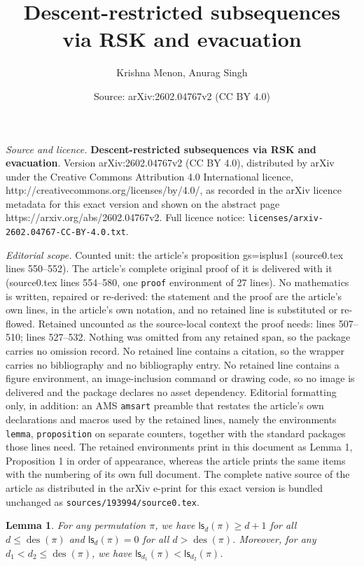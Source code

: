 \documentclass[10pt,a4paper]{amsart}
\title{\large\textbf{Descent-restricted subsequences via RSK and evacuation}}
\author{Krishna Menon, Anurag Singh}
\date{Source: arXiv:2602.04767v2 (CC BY 4.0)}
\newtheorem{lemma}{Lemma}
\newcommand{\des}{\operatorname{des}}
\newcommand{\ls}{\mathsf{ls}}
\begin{document}
\maketitle

\noindent\emph{Source and licence.} \large\textbf{Descent-restricted subsequences via RSK and evacuation}. Version arXiv:2602.04767v2 (CC BY 4.0), distributed by arXiv under the Creative Commons Attribution 4.0 International licence, http://creativecommons.org/licenses/by/4.0/, as recorded in the arXiv licence metadata for this exact version and shown on the abstract page https://arxiv.org/abs/2602.04767v2. Full licence notice: \texttt{licenses/arxiv-2602.04767-CC-BY-4.0.txt}.\par\smallskip

\noindent\textit{Editorial scope.} Counted unit: the article's proposition gs=isplus1 (source0.tex lines 550--552). The article's complete original proof of it is delivered with it (source0.tex lines 554--580, one \texttt{proof} environment of 27 lines). No mathematics is written, repaired or re-derived: the statement and the proof are the article's own lines, in the article's own notation, and no retained line is substituted or re-flowed.  Retained uncounted as the source-local context the proof needs: lines 507--510; lines 527--532.  Nothing was omitted from any retained span, so the package carries no omission record.  No retained line contains a citation, so the wrapper carries no bibliography and no bibliography entry.  No retained line contains a figure environment, an image-inclusion command or drawing code, so no image is delivered and the package declares no asset dependency.  Editorial formatting only, in addition: an AMS \texttt{amsart} preamble that restates the article's own declarations and macros used by the retained lines, namely the environments \texttt{lemma}, \texttt{proposition} on separate counters, together with the standard packages those lines need.  The retained environments print in this document as Lemma 1, Proposition 1 in order of appearance, whereas the article prints the same items with the numbering of its own full document.  The complete native source of the article as distributed in the arXiv e-print for this exact version is bundled unchanged as \texttt{sources/193994/source0.tex}.
\begin{lemma}\label{lsdnonzero}
	For any permutation $\pi$, we have $\ls_d(\pi) \geq d + 1$ for all
	$d \leq \des(\pi)$ and $\ls_d(\pi) = 0$ for all $d > \des(\pi)$. Moreover, for any $d_1 < d_2 \leq \des(\pi)$, we have $\ls_{d_1}(\pi) < \ls_{d_2}(\pi)$.
\end{lemma}
\end{document}

